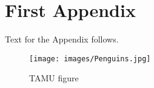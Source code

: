 %
%
%
%
%



\chapter{First Appendix}

Text for the Appendix follows.

\begin{figure}[h]
    \centering
    \texttt{[image: images/Penguins.jpg]}
    \caption{TAMU figure}
    \label{fig:tamu-fig5}
\end{figure}
